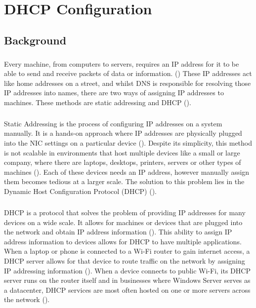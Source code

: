\chapter{DHCP Configuration}

\section{Background}
\paragraph{}
Every machine, from computers to servers, requires an IP address
for it to be able to send and receive packets of data or information. (\cite{masterWS19})
These IP addresses act like home addresses on a street, and whilst DNS is 
responsible for resolving those IP addresses into names, there are two ways 
of assigning IP addresses to machines. These methods are static addressing
and DHCP (\cite{masterWS19}).

\paragraph{}
Static Addressing is the process of configuring IP addresses on a system
manually. It is a hands-on approach where IP addresses
are physically plugged into the NIC settings on a particular device (\cite{masterWS19}).
Despite its simplicity, this method is not scalable in environments that host
multiple devices like a small or large company, where there are laptops, desktops, 
printers, servers or other types of machines (\cite{masterWS19}). Each of these
devices needs an IP address, however manually assign them becomes tedious at a larger scale. The solution
to this problem lies in the Dynamic Host Configuration Protocol (DHCP) (\cite{masterWS19}).

\paragraph{}
DHCP is a protocol that solves the problem of providing IP addresses for many devices
on a wide scale. It allows for machines or devices that are plugged into the network and obtain 
IP address information (\cite{masterWS19}). This ability to assign IP address information to devices 
allows for DHCP to have multiple applications. When a laptop or phone is connected to a Wi-Fi router
to gain internet access, a DHCP server allows for that device to route traffic on the network by assigning
IP addressing information (\cite{masterWS19}). When a device connects to public Wi-Fi, its DHCP server runs on the router itself
and in businesses where Windows Server serves as a datacenter, DHCP services are most often hosted 
on one or more servers across the network (\cite{masterWS19}).

